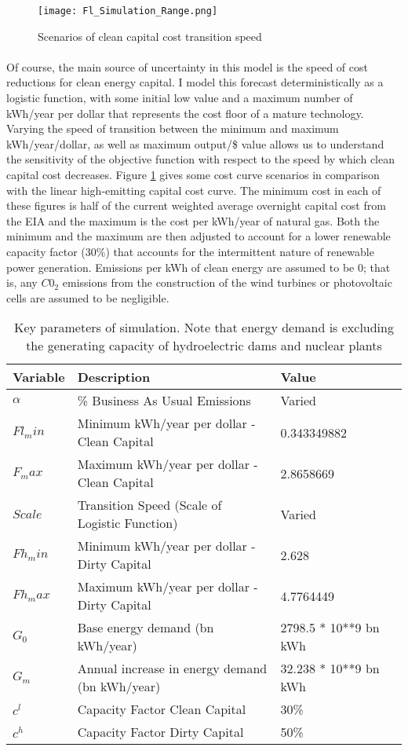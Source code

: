 \documentclass{article}
\begin{document}
\begin{figure}[h]
\texttt{[image: Fl\_Simulation\_Range.png]}
\caption{Scenarios of clean capital cost transition speed \label{fig:FlScaleScenarios}}
\end{figure}

\paragraph{} Of course, the main source of uncertainty in this model is the speed of cost reductions for clean energy capital. I model this forecast deterministically as a logistic function, with some initial low value and a maximum number of kWh/year per dollar that represents the cost floor of a mature technology. Varying the speed of transition between the minimum and maximum kWh/year/dollar, as well as maximum output/\$ value allows us to understand the sensitivity of the objective function with respect to the speed by which clean capital cost decreases. Figure \ref{fig:FlScaleScenarios} gives some cost curve scenarios in comparison with the linear high-emitting capital cost curve. The minimum cost in each of these figures is half of the current weighted average overnight capital cost from the EIA and the maximum is the cost per kWh/year of natural gas. Both the minimum and the maximum are then adjusted to account for a lower renewable capacity factor (30\%) that accounts for the intermittent nature of renewable power generation. Emissions per kWh of clean energy are assumed to be 0; that is, any $C0_2$ emissions from the construction of the wind turbines or photovoltaic cells are assumed to be negligible. 


\begin{table}[h]\label{tab:ParamValues}
\begin{tabulary}{1.0\textwidth}{LLLL}
Variable & Description & Value\\
\hline
$\alpha$ &  \% Business As Usual Emissions  &  Varied \\
$Fl_min$ & Minimum kWh/year per dollar - Clean Capital & 0.343349882\\
$F_max$ & Maximum kWh/year per dollar - Clean Capital & 2.8658669 \\
$Scale$ & Transition Speed  (Scale of Logistic Function) & Varied \\
$Fh_min$ & Minimum kWh/year per dollar - Dirty Capital & 2.628 \\
$Fh_max$ & Maximum kWh/year per dollar - Dirty Capital & 4.7764449 \\
$G_0$ & Base energy demand (bn kWh/year) & 2798.5 * 10**9 bn kWh\\
$G_m$ & Annual increase in energy demand (bn kWh/year) & 32.238 * 10**9 bn kWh \\
$c^l$ & Capacity Factor Clean Capital & 30\% \\
$c^h$ & Capacity Factor Dirty Capital & 50\% \\
\hline
\end{tabulary}
\caption{Key parameters of simulation. Note that energy demand is excluding the generating capacity of hydroelectric dams and nuclear plants}
\end{table}
\end{document}
